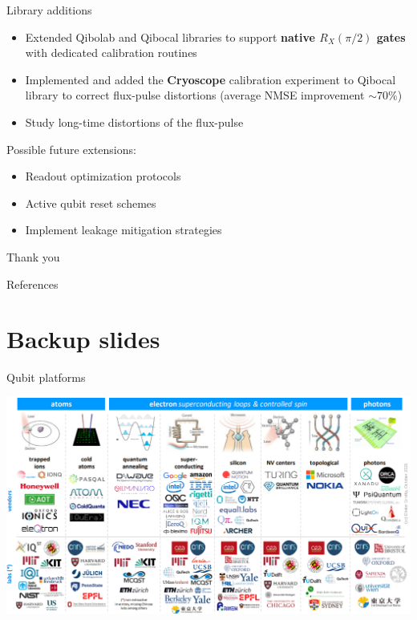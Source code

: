 \documentclass[aspectratio=169,10pt]{beamer}
\newcounter{mainframenumber}
\newcommand{\backupbegin}{
  \setcounter{mainframenumber}{\value{framenumber}}
}
\begin{document}
\begin{frame}{Library additions}
  \begin{itemize}
    \item[\ding{51}] Extended Qibolab and Qibocal libraries to support \textbf{native $R_X(\pi/2)$ gates} with dedicated calibration routines
    \item[\ding{51}] Implemented and added the \textbf{Cryoscope} calibration experiment to Qibocal library to correct flux-pulse distortions (average NMSE improvement $\sim 70\%$)
    \item[\ding{55}] Study long-time distortions of the flux-pulse
  \end{itemize}
  Possible future extensions: 
  \begin{itemize}[label={\raisebox{0.2ex}{\tiny$\bullet$}}]
    \item Readout optimization protocols
    \item Active qubit reset schemes
    \item Implement leakage mitigation strategies
  \end{itemize}
\end{frame}

\begin{frame}[t,standout]
\Large
Thank you
\end{frame}


\backupbegin
\appendix

\begin{frame}{References}
    \printbibliography
\end{frame}


\section*{Backup slides}

\begin{frame}{Qubit platforms}
  \begin{center}
      \includegraphics[height=0.82\textheight]{figures/platforms.png}
  \end{center}
\end{frame}
\end{document}
